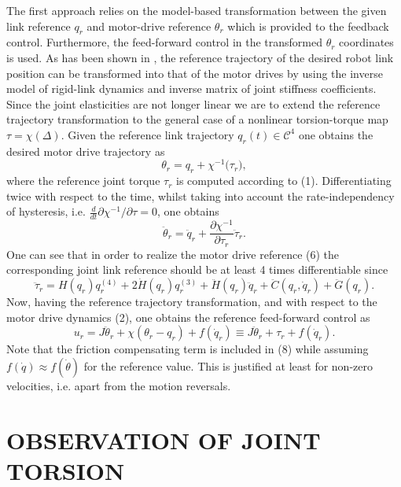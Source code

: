\documentclass[a4paper, 10pt, conference]{ieeeconf}
\begin{document}
The first approach relies on the model-based transformation
between the given link reference $q_{r}$ and motor-drive reference
$\theta _{r}$ which is provided to the feedback control.
Furthermore, the feed-forward control in the transformed $\theta
_{r}$ coordinates is used. As has been shown in \cite{DeLuca00},
the reference trajectory of the desired robot link position can be
transformed into that of the motor drives by using the inverse
model of rigid-link dynamics and inverse matrix of joint stiffness
coefficients. Since the joint elasticities are not longer linear
we are to extend the reference trajectory transformation to the
general case of a nonlinear torsion-torque map $\tau =
\chi(\Delta)$. Given the reference link trajectory $q_{r}(t) \in
\mathcal{C}^{4}$ one obtains the desired motor drive trajectory as
\begin{equation}\label{1}
\theta_{r} = q_{r} + \chi^{-1}\bigl(\tau_{r}\bigr),
\end{equation}
where the reference joint torque $\tau_{r}$ is computed according
to (1). Differentiating twice with respect to the time, whilst
taking into account the rate-independency of hysteresis, i.e.
$\frac{d}{dt} \partial \chi ^{-1}/\partial \tau = 0$, one obtains
\begin{equation}\label{2}
\ddot{\theta} _{r} = \ddot{q} _{r} + \frac{\partial \chi
^{-1}}{\partial \tau_{r}}  \ddot{\tau} _{r}.
\end{equation}
One can see that in order to realize the motor drive reference (6)
the corresponding joint link reference should be at least 4 times
differentiable since
\begin{equation}\label{3}
\ddot{\tau} _{r} = H(q_{r}) q_{r}^{(4)} +
2\dot{H}(q_{r})q_{r}^{(3)} + \ddot{H}(q_{r})\ddot{q}_{r} +
\ddot{C}(q_{r}, \dot{q}_{r}) + \ddot{G}(q_{r}).
\end{equation}
Now, having the reference trajectory transformation, and with
respect to the motor drive dynamics (2), one obtains the reference
feed-forward control as
\begin{equation}\label{4}
u_{r} = J\ddot{\theta} _{r} + \chi(\theta_{r} - q_{r}) +
f(\dot{q}_{r}) \equiv J\ddot{\theta} _{r} + \tau_{r} +
f(\dot{q}_{r}).
\end{equation}
Note that the friction compensating term is included in (8) while
assuming $f(\dot{q}) \approx f(\dot{\theta})$ for the reference
value. This is justified at least for non-zero velocities, i.e.
apart from the motion reversals.


\section{OBSERVATION OF JOINT TORSION}
\label{sec:4}
\end{document}
